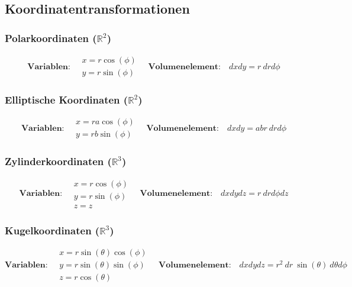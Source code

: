 \documentclass[11pt]{article}
\begin{document}
\subsection{Koordinatentransformationen}

\subsubsection{Polarkoordinaten ($\mathbb{R}^2$)}

\begin{equation*}
	\textbf{Variablen:}\quad \begin{matrix}
		x = r\cos(\phi) \\ y = r\sin(\phi)
	\end{matrix} \quad \textbf{Volumenelement:}\quad dxdy = r\ drd\phi
\end{equation*}

\subsubsection{Elliptische Koordinaten ($\mathbb{R}^2$)}

\begin{equation*}
	\textbf{Variablen:}\quad \begin{matrix}
		x = ra\cos(\phi) \\ y = rb\sin(\phi)
	\end{matrix} \quad \textbf{Volumenelement:}\quad dxdy = abr\ drd\phi
\end{equation*}

\subsubsection{Zylinderkoordinaten ($\mathbb{R}^3$)}

\begin{equation*}
	\textbf{Variablen:}\quad \begin{matrix}
		x = r\cos(\phi) \\ y = r\sin(\phi) \\ z = z
	\end{matrix} \quad \textbf{Volumenelement:}\quad dxdydz = r\ drd\phi dz
\end{equation*}

\subsubsection{Kugelkoordinaten ($\mathbb{R}^3$)}

\begin{equation*}
	\textbf{Variablen:}\quad \begin{matrix}
		x = r\sin(\theta)\cos(\phi) \\ y = r\sin(\theta)\sin(\phi) \\ z = r\cos(\theta)
	\end{matrix} \quad \textbf{Volumenelement:}\quad dxdydz = r^2\ dr\ \sin(\theta)\ d\theta d\phi
\end{equation*}
\end{document}
